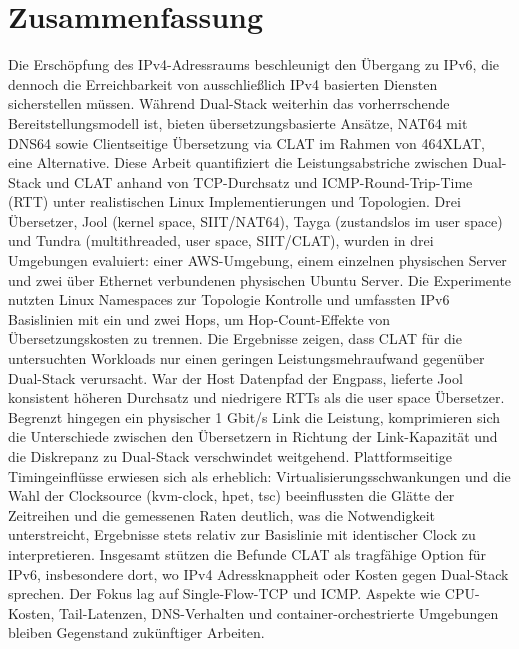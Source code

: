 \section*{Zusammenfassung}

Die Erschöpfung des IPv4-Adressraums beschleunigt den Übergang zu IPv6, die dennoch die Erreichbarkeit von ausschließlich IPv4 basierten Diensten sicherstellen müssen. Während Dual-Stack weiterhin das vorherrschende Bereitstellungsmodell ist, bieten übersetzungsbasierte Ansätze, NAT64 mit DNS64 sowie Clientseitige Übersetzung via CLAT im Rahmen von 464XLAT, eine Alternative. Diese Arbeit quantifiziert die Leistungsabstriche zwischen Dual-Stack und CLAT anhand von TCP-Durchsatz und ICMP-Round-Trip-Time (RTT) unter realistischen Linux Implementierungen und Topologien. Drei Übersetzer, Jool (kernel space, SIIT/NAT64), Tayga (zustandslos im user space) und Tundra (multithreaded, user space, SIIT/CLAT), wurden in drei Umgebungen evaluiert: einer AWS-Umgebung, einem einzelnen physischen Server und zwei über Ethernet verbundenen physischen Ubuntu Server. Die Experimente nutzten Linux Namespaces zur Topologie Kontrolle und umfassten IPv6 Basislinien mit ein und zwei Hops, um Hop-Count-Effekte von Übersetzungskosten zu trennen.
Die Ergebnisse zeigen, dass CLAT für die untersuchten Workloads nur einen geringen Leistungsmehraufwand gegenüber Dual-Stack verursacht. War der Host Datenpfad der Engpass, lieferte Jool konsistent höheren Durchsatz und niedrigere RTTs als die user space Übersetzer. Begrenzt hingegen ein physischer 1 Gbit/s Link die Leistung, komprimieren sich die Unterschiede zwischen den Übersetzern in Richtung der Link-Kapazität und die Diskrepanz zu Dual-Stack verschwindet weitgehend. Plattformseitige Timingeinflüsse erwiesen sich als erheblich: Virtualisierungsschwankungen und die Wahl der Clocksource (kvm-clock, hpet, tsc) beeinflussten die Glätte der Zeitreihen und die gemessenen Raten deutlich, was die Notwendigkeit unterstreicht, Ergebnisse stets relativ zur Basislinie mit identischer Clock zu interpretieren. Insgesamt stützen die Befunde CLAT als tragfähige Option für IPv6, insbesondere dort, wo IPv4 Adressknappheit oder Kosten gegen Dual-Stack sprechen. Der Fokus lag auf Single-Flow-TCP und ICMP. Aspekte wie CPU-Kosten, Tail-Latenzen, DNS-Verhalten und container-orchestrierte Umgebungen bleiben Gegenstand zukünftiger Arbeiten.
